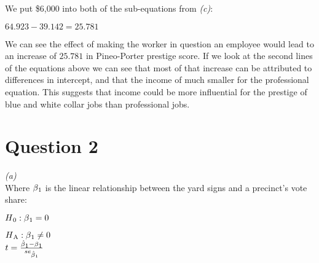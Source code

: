 \documentclass[12pt,letterpaper]{article}
\begin{document}
\noindent We put \$6,000 into both of the sub-equations from \textit{(c)}: \\


\par
\begin{Parallel}[v]{0.48\textwidth}{0.48\textwidth}
	\ParallelPar
\end{Parallel}

\begin{center} $64.923 - 39.142 = 25.781$\\
\end{center}

\noindent We can see the effect of making the worker in question an employee would lead to an increase of $25.781$ in Pineo-Porter prestige score. If we look at the second lines of the equations above we can see that most of that increase can be attributed to differences in intercept, and that the income of much smaller for the professional equation. This suggests that income could be more influential for the prestige of blue and white collar jobs than professional jobs.
\clearpage

\section*{Question 2}


\textit{(a)}\\

\noindent Where $\beta\textsubscript{1}$ is the linear relationship between the yard signs and a precinct's vote share:

\noindent $H\textsubscript{0}: \beta\textsubscript{1} = 0$ 

\noindent $H\textsubscript{A}: \beta\textsubscript{1} \neq 0$ \\

\noindent $t =  \frac{\hat{\beta}\textsubscript{1} - \beta\textsubscript{1}}{se\textsubscript{$\hat{\beta}\textsubscript{1}$}}$\\
\end{document}
